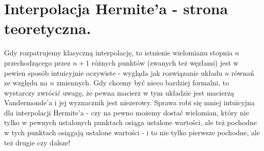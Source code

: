 \documentclass[10pt,wide]{mwart}
\theoremstyle{definition}
\begin{document}
 \section{Interpolacja Hermite'a - strona teoretyczna.}
Gdy rozpatrujemy klasyczną interpolację, to istnienie wielomianu stopnia \(n\) przechodzącego przez \(n+1\) różnych punktów (zwanych też węzłami) jest w pewien sposób intuicyjnie oczywiste - wygląda jak rozwiązanie układu \(n \) równań ze względu na \(n\) zmiennych. Gdy chcemy być nieco bardziej formalni, to wystarczy zwrócić uwagę, że pewna macierz w tym układzie jest macierzą Vandermonde'a i jej wyznacznik jest niezerowy. Sprawa robi się mniej intuicyjna dla interpolacji Hermite'a - czy na pewno możemy dostać wielomian, który nie tylko w pewnych ustalonych punktach osiąga ustalone wartości, ale też pochodne w tych punktach osiągają ustalone wartości - i to nie tylko pierwsze pochodne, ale też drugie czy dalsze!
\end{document}
